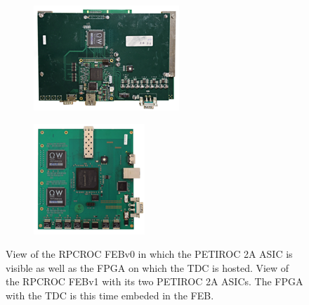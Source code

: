 	\begin{figure}[H]
		\begin{subfigure}{0.5\linewidth}
		    \centering
			\includegraphics[width = 0.8\linewidth]{fig/chapt6/iRPC-RPCROCv0.png}
			\caption{\label{fig:RPCROC_FEB:A}}
		\end{subfigure}
		\begin{subfigure}{0.5\linewidth}
		    \centering
			\includegraphics[width = 0.8\linewidth]{fig/chapt6/iRPC-RPCROCv1.png}
			\caption{\label{fig:RPCROC_FEB:B}}
		\end{subfigure}
		\caption{\label{fig:RPCROC_FEB}  View of the RPCROC FEBv0 in which the PETIROC 2A ASIC is visible as well as the FPGA on which the TDC is hosted.  View of the RPCROC FEBv1 with its two PETIROC 2A ASICs. The FPGA with the TDC is this time embeded in the FEB.}
	\end{figure}


